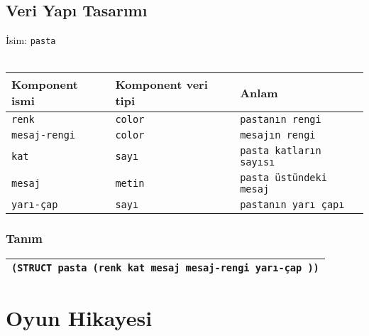 \documentclass[12pt, a4paper]{article}
\begin{document}
\subsection*{Veri Yapı Tasarımı}
İsim: \texttt{pasta}\\
\vspace{0.5cm}\\
\begin{tabular}{| p{4cm} | p{4cm} | p{8cm} |  }
\hline			
Komponent ismi&Komponent veri tipi&Anlam\\
\hline
\texttt{renk}&\texttt{color} &\texttt{pastanın rengi}\\[10ex]
\hline  
\texttt{mesaj-rengi}&\texttt{color} &\texttt{mesajın rengi} \\[10ex]
\hline  
\texttt{kat}&\texttt{sayı} &\texttt{pasta katların sayısı} \\[10ex]
\hline  
\texttt{mesaj}&\texttt{metin} &\texttt{pasta üstündeki mesaj} \\[10ex]
\hline  
\texttt{yarı-çap}&\texttt{sayı} &\texttt{pastanın yarı çapı} \\[10ex]
\hline  
\end{tabular}

\subsubsection*{Tanım}
\begin{tabular}{| p{17cm} |  }
\hline			
\vspace{0.5cm}
\texttt{(STRUCT pasta (renk kat mesaj mesaj-rengi yarı-çap ))}\\[10ex]
\hline
\end{tabular}













\newpage
\section*{Oyun Hikayesi}
 
\end{document}
